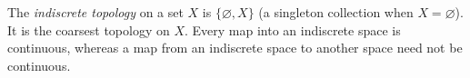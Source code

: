 
The \emph{indiscrete topology} on a set $X$ is $\{\varnothing,X\}$ (a singleton collection when $X=\varnothing$). It is the coarsest topology on $X$. Every map into an indiscrete space is continuous, whereas a map from an indiscrete space to another space need not be continuous.

